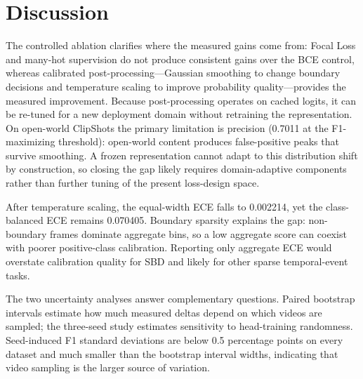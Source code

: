 \section{Discussion}
\label{sec:discussion}

The controlled ablation clarifies where the measured gains come from: Focal Loss and
many-hot supervision do not produce consistent gains over the BCE control,
whereas calibrated post-processing---Gaussian smoothing to change boundary
decisions and temperature scaling to improve probability quality---provides
the measured improvement. Because post-processing operates on cached logits,
it can be re-tuned for a new deployment domain without retraining the
representation. On open-world ClipShots the primary limitation is precision
(0.7011 at the F1-maximizing threshold): open-world content produces
false-positive peaks that survive smoothing. A frozen representation cannot
adapt to this distribution shift by construction, so closing the gap likely
requires domain-adaptive components rather than further tuning of the present
loss-design space.

After temperature scaling, the equal-width ECE falls to 0.002214, yet the
class-balanced ECE remains 0.070405. Boundary sparsity explains the gap:
non-boundary frames dominate aggregate bins, so a low aggregate score can
coexist with poorer positive-class calibration. Reporting only aggregate ECE
would overstate calibration quality for SBD and likely for other sparse
temporal-event tasks.

The two uncertainty analyses answer complementary questions. Paired bootstrap
intervals estimate how much measured deltas depend on which videos are
sampled; the three-seed study estimates sensitivity to head-training
randomness. Seed-induced F1 standard deviations are below 0.5 percentage
points on every dataset and much smaller than the bootstrap interval widths,
indicating that video sampling is the larger source of variation.
